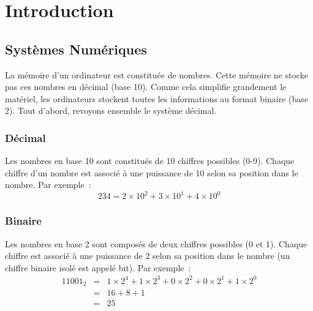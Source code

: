 \chapter{Introduction}
\section{Systèmes Numériques}

La mémoire d'un ordinateur est constituée de nombres. Cette mémoire ne
stocke pas ces nombres en décimal (base 10). Comme cela simplifie
grandement le matériel, les ordinateurs stockent toutes les informations
au format binaire (base 2). Tout d'abord, revoyons ensemble le système
décimal.

\subsection{Décimal}

Les nombres en base 10 sont constitués de 10 chiffres possibles (0-9).
Chaque chiffre d'un nombre est associé à une puissance de 10 selon sa
position dans le nombre. Par exemple~:
\begin{displaymath}
234 = 2 \times 10^2 + 3 \times 10^1 + 4 \times 10^0
\end{displaymath}

\subsection{Binaire}

Les nombres en base 2 sont composés de deux chiffres possibles (0 et 1).
Chaque chiffre est associé à une puissance de 2 selon sa position dans
le nombre (un chiffre binaire isolé est appelé bit). Par exemple~:
\begin{eqnarray*}
11001_2 & = & 1 \times 2^4 + 1 \times 2^3 + 0 \times 2^2 + 0 \times 2^1 
              + 1 \times 2^0 \\
 & = & 16 + 8 + 1 \\
 & = & 25 
\end{eqnarray*}

